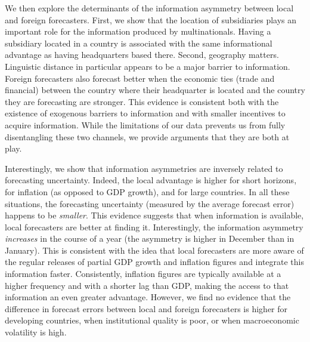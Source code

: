 We then explore the determinants of the information asymmetry between local and foreign forecasters. First, we show that the location of subsidiaries plays an important role for the information produced by multinationals. Having a subsidiary located in a country is associated with the same informational advantage as having headquarters based there. Second, geography matters. Linguistic distance in particular appears to be a major barrier to information. Foreign forecasters also forecast better when the economic ties (trade and financial) between the country where their headquarter is located and the country they are forecasting are stronger. This evidence is consistent both with the existence of exogenous barriers to information and with smaller incentives to acquire information. While the limitations of our data prevents us from fully disentangling these two channels, we provide arguments that they are both at play.

Interestingly, we show that information asymmetries are inversely related to forecasting uncertainty. Indeed, the local advantage is higher for short horizons, for inflation (as opposed to GDP growth), and for large countries. In all these situations, the forecasting uncertainty (measured by the average forecast error) happens to be \emph{smaller}. This evidence suggests that when information is available, local forecasters are better at finding it. Interestingly, the information asymmetry \emph{increases} in the course of a year (the asymmetry is higher in December than in January). This is consistent with the idea that local forecasters are more aware of the regular releases of partial GDP growth and inflation figures and integrate this information faster. Consistently, inflation figures are typically available at a higher frequency and with a shorter lag than GDP, making the access to that information an even greater advantage. However, we find no evidence that the difference in forecast errors between local and foreign forecasters is higher for developing countries, when institutional quality is poor, or when macroeconomic volatility is high.


